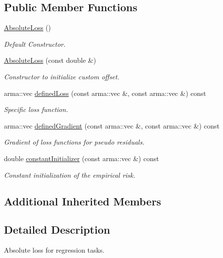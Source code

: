 \subsection*{Public Member Functions}
\begin{DoxyCompactItemize}
\item 
\hyperlink{classloss_1_1_absolute_loss_a4b1416147d0573079f9d652097c1ab81}{Absolute\+Loss} ()
\begin{DoxyCompactList}\small\item\em Default Constructor. \end{DoxyCompactList}\item 
\hyperlink{classloss_1_1_absolute_loss_a3e056fbde0b63527bb9aadb0a4a8547a}{Absolute\+Loss} (const double \&)
\begin{DoxyCompactList}\small\item\em Constructor to initialize custom offset. \end{DoxyCompactList}\item 
arma\+::vec \hyperlink{classloss_1_1_absolute_loss_acfef6f0de3cfcccebd4bbfc04133cf1e}{defined\+Loss} (const arma\+::vec \&, const arma\+::vec \&) const
\begin{DoxyCompactList}\small\item\em Specific loss function. \end{DoxyCompactList}\item 
arma\+::vec \hyperlink{classloss_1_1_absolute_loss_a1886fc8ca065c6f0a207b7a8a0f8444d}{defined\+Gradient} (const arma\+::vec \&, const arma\+::vec \&) const
\begin{DoxyCompactList}\small\item\em Gradient of loss functions for pseudo residuals. \end{DoxyCompactList}\item 
double \hyperlink{classloss_1_1_absolute_loss_aa2ac5fb1fdf3ce0f48decd77d375ef76}{constant\+Initializer} (const arma\+::vec \&) const
\begin{DoxyCompactList}\small\item\em Constant initialization of the empirical risk. \end{DoxyCompactList}\end{DoxyCompactItemize}
\subsection*{Additional Inherited Members}


\subsection{Detailed Description}
Absolute loss for regression tasks. 

